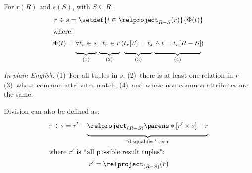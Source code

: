 \begin{multicols}{2}

    \begin{CheatsheetEntryFrame}

         \MarkExtendedRelAlg

        For $r(R)$ and $s(S)$, with $S \subseteq R$:
        \newcommand{\X}{\rule[-2ex]{0mm}{2ex}}
        \begin{gather*}
            r \div s = \setdef{t \in \relproject_{R-S}{(r)}}{\Phi(t)} \\
            \intertext{where:}
            \Phi(t) =
                \underbrace{\X \forall t_s \in s}_{(1)}
                \, \underbrace{\X \exists t_r \in r}_{(2)}
                \, (
                    \underbrace{\X t_r[S] = t_s}_{(3)}
                    \underbrace{\X \wedge t = t_r[R-S]}_{(4)}
                )
        \end{gather*}

        \textit{In plain English:} (1)~For all tuples in $s$, (2)~there is at least one relation in $r$ (3)~whose common attributes match, (4)~and whose non-common attributes are the same.

        \vspace{\TextExtraSkip}%
        Division can also be defined as:
        \begin{gather*}
            r \div s =
                r' -
                \underbrace{ \rule[-2ex]{0mm}{2ex}
                    \relproject_{(R-S)}{\parens*{\vphantom{\frac{x}{x}} [r' \times s] - r}}
                }_{\text{``disqualifier" term}}
                \\
            \intertext{where $r'$ is ``all possible result tuples":}
            r' = \relproject_{(R-S)}{(r)}
        \end{gather*}


\end{CheatsheetEntryFrame}
\end{multicols}
